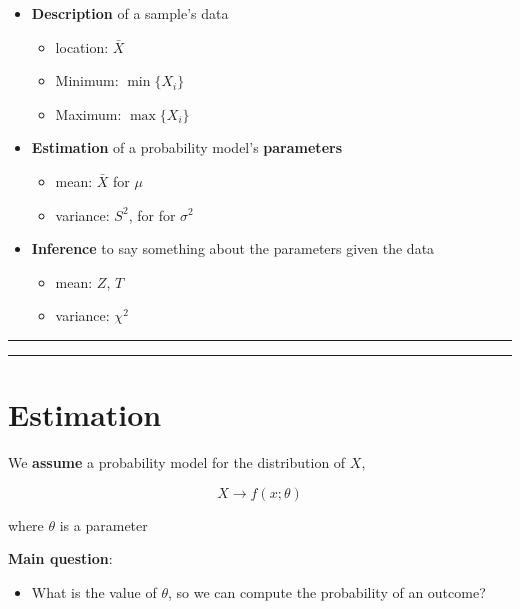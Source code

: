 \documentclass[
]{book}
\providecommand{\tightlist}{%
  \setlength{\itemsep}{0pt}\setlength{\parskip}{0pt}}
\begin{document}
\begin{itemize}
\item
  \textbf{Description} of a sample's data

  \begin{itemize}
  \tightlist
  \item
    location: \(\bar{X}\)
  \item
    Minimum: \(\min\{X_i\}\)
  \item
    Maximum: \(\max\{X_i\}\)
  \end{itemize}
\item
  \textbf{Estimation} of a probability model's \textbf{parameters}

  \begin{itemize}
  \tightlist
  \item
    mean: \(\bar{X}\) for \(\mu\)
  \item
    variance: \(S^2\), for for \(\sigma^2\)
  \end{itemize}
\item
  \textbf{Inference} to say something about the parameters given the data

  \begin{itemize}
  \tightlist
  \item
    mean: \(Z\), \(T\)
  \item
    variance: \(\chi^2\)
  \end{itemize}
\end{itemize}

\begin{center}\rule{0.5\linewidth}{0.5pt}\end{center}

\begin{center}\rule{0.5\linewidth}{0.5pt}\end{center}

\hypertarget{estimation}{%
\section{Estimation}\label{estimation}}

We \textbf{assume} a probability model for the distribution of \(X\),

\[X \rightarrow f(x; \theta)\]

where \(\theta\) is a parameter

\textbf{Main question}:

\begin{itemize}
\tightlist
\item
  What is the value of \(\theta\), so we can compute the probability of an outcome?
\end{itemize}
\end{document}
